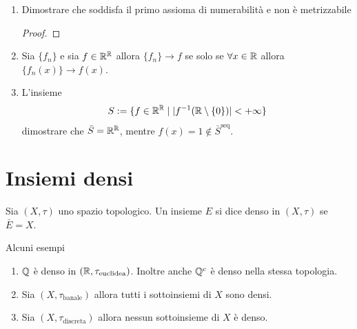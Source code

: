 \begin{remark}
\begin{enumerate}
\begin{proof}
		per cui, si, genera una e una sola topologia.
		\end{proof}
		\item Dimostrare che soddisfa il primo assioma di numerabilità e non è metrizzabile
		\begin{proof}
		\end{proof}
		\item Sia $\{f_n\}$ e sia $f \in \mathbb{R}^{\mathbb{R}}$ allora $\{f_n\} \rightarrow f$ se solo se $\forall x \in \mathbb{R}$ allora $\{f_n(x)\} \rightarrow f(x)$.
		\item L'insieme 
		\begin{equation}
		\begin{aligned}	
			S := \{ f \in \mathbb{R}^{\mathbb{R}} \; | \; |f^{-1}(\mathbb{R} \setminus \{0\})| < +\infty \}
		\end{aligned}
		\end{equation}
		dimostrare che $\bar{S} = \mathbb{R}^{\mathbb{R}}$, mentre $f(x)= 1 \notin \bar{S}^\text{seq}$.
	\end{enumerate}
	\end{remark}

\section{Insiemi densi}
\begin{definition}
	Sia $(X,\tau)$ uno spazio topologico. Un insieme $E$ si dice denso in $(X, \tau)$ se $\bar{E} = X$. 
\end{definition}

Alcuni esempi
\begin{enumerate}
	\item $\mathbb{Q}$ è denso in $(\mathbb{R}, \tau_{\text{euclidea}})$. Inoltre anche $\mathbb{Q}^c$ è denso nella stessa topologia.
	\item Sia $(X,\tau_{\text{banale}})$ allora tutti i sottoinsiemi di $X$ sono densi.
	\item Sia $(X,\tau_{\text{discreta}})$ allora nessun sottoinsieme di $X$ è denso.
\end{enumerate}

